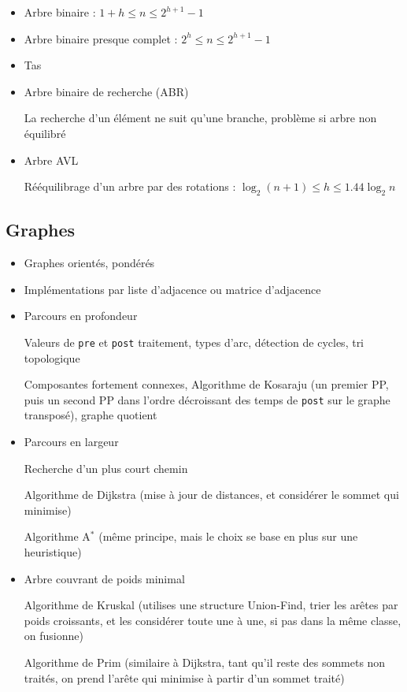 \documentclass[10pt,a4paper]{article}
\begin{document}
%
\begin{itemize}[noitemsep]
	\item Arbre binaire : \(  1+h \leq n \leq 2^{h+1}-1  \)
	\item Arbre binaire presque complet : %
		\(  2^h \leq n \leq 2^{h+1}-1  \)
	\item Tas
	\item Arbre binaire de recherche (ABR)
	
		La recherche d'un élément ne suit qu'une branche, problème si arbre non équilibré
	\item Arbre AVL
	
		Rééquilibrage d'un arbre par des rotations :
		\(  \log _2(n+1) \leq h \leq 1.44\log _2 n  \)
	
\end{itemize}
%



\subsection{Graphes}

%
\begin{itemize}[noitemsep]
	\item Graphes orientés, pondérés
	\item Implémentations par liste d'adjacence ou matrice d'adjacence
	\item Parcours en profondeur
	
		Valeurs de \texttt{pre} et \texttt{post} traitement, types d'arc, détection de cycles, tri topologique
		
		Composantes fortement  connexes, Algorithme de Kosaraju (un premier PP, puis un second PP dans l'ordre décroissant des temps de \texttt{post} sur le graphe transposé), graphe quotient
	\item Parcours en largeur
	
		Recherche d'un plus court chemin
		
		Algorithme de Dijkstra (mise à jour de distances, et considérer le sommet qui minimise)
		
		Algorithme A\(^*\) (même principe, mais le choix se base en plus sur une heuristique)
	\item Arbre couvrant de poids minimal
	
	Algorithme de Kruskal (utilises une structure Union-Find, trier les arêtes par poids croissants, et les considérer toute une à une, si pas dans la même classe, on fusionne)
	
	Algorithme de Prim (similaire à Dijkstra, tant qu'il reste des sommets non traités, on prend l'arête qui minimise à partir d'un sommet traité)
\end{itemize}
%
\end{document}
